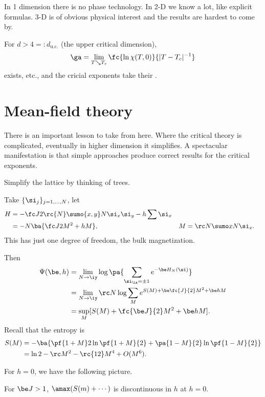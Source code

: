 In 1 dimension there is no phase technology. In 2-D we know a lot, like explicit formulas. 3-D is of obvious physical interest and the results are hardest to come by.

For $d>4=:d_{\text{u.c.}}$ (the upper critical dimension),
\[
\ga = \lim_{T\searrow T_c} \fc{\ln \chi(T,0)}{|T-T_c|^{-1}}
\]
exists, etc., and the cricial exponents take their .

\section{Mean-field theory}
There is an important lesson to take from here. Where the critical theory  is complicated, eventually in higher dimension it simplifies. A spectacular manifestation is that simple approaches produce correct results for the critical exponents.

Simplify the lattice by thinking of trees.

Take $\{\si_j\}_{j=1,\ldots, N}$, let 
\begin{align}
H &=-\fc J2 \rc{N} \sumo{x,y}N \si_x\si_y - h\sum\si_x\\
& = -N\ba{\fc J2 M^2 + hM}, &M&=\rc N\sumo xN \si_x.
\end{align}
This has just one degree of freedom, the bulk magnetization.

Then
\begin{align}
\Psi(\be, h)&=\lim_{N\to \iy} \log\pa{\sum_{\si_\La = \pm1} e^{-\be H_N(\si)}}\\
&= \lim_{N\to \iy} \rc N \log \sum_M e^{S(M)+\be \fc{J}{2}M^2 + \be h M}\\
&=\sup_M [S(M) + \fc{\be J}{2}M^2 + \be hM].
\end{align}
Recall that the entropy is 
\begin{align}
S(M) &= -\ba{\pf{1+M}2 \ln \pf{1+M}{2} + \pa{1-M}{2}\ln \pf{1-M}{2}}\\
&=\ln 2 - \rc M^2  - \rc{12}M^4 + O(M^6).
\end{align}

For $h=0$, we have the following picture. 



For $\be J>1$, $\amax(S(m) +\cdots)$ is discontinuous in $h$ at $h=0$.

